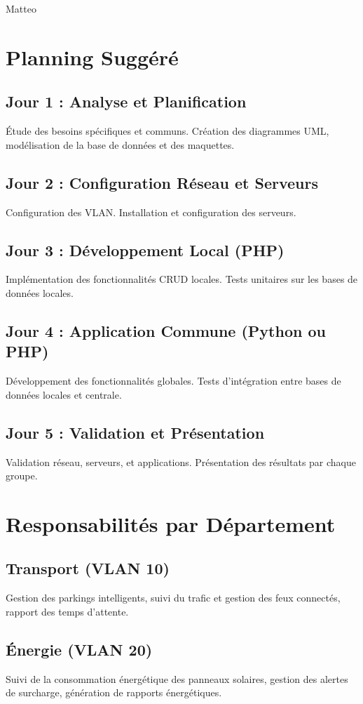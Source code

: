 \documentclass[a4paper,12pt]{report}
\begin{document}
Matteo

\chapter{Planning Suggéré}
\section{Jour 1 : Analyse et Planification}
Étude des besoins spécifiques et communs. Création des diagrammes UML, modélisation de la base de données et des maquettes.

\section{Jour 2 : Configuration Réseau et Serveurs}
Configuration des VLAN. Installation et configuration des serveurs.

\section{Jour 3 : Développement Local (PHP)}
Implémentation des fonctionnalités CRUD locales. Tests unitaires sur les bases de données locales.

\section{Jour 4 : Application Commune (Python ou PHP)}
Développement des fonctionnalités globales. Tests d'intégration entre bases de données locales et centrale.

\section{Jour 5 : Validation et Présentation}
Validation réseau, serveurs, et applications. Présentation des résultats par chaque groupe.

\chapter{Responsabilités par Département}
\section{Transport (VLAN 10)}
Gestion des parkings intelligents, suivi du trafic et gestion des feux connectés, rapport des temps d'attente.

\section{Énergie (VLAN 20)}
Suivi de la consommation énergétique des panneaux solaires, gestion des alertes de surcharge, génération de rapports énergétiques.
\end{document}
